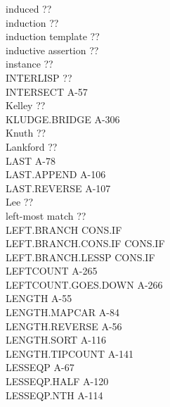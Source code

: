 \documentclass[10pt]{book}
\newenvironment{pubasis}{\begin{flushleft}}{\end{flushleft}}
\begin{document}
\begin{pubasis}
induced                                      ??\\
induction                                    ??\\
induction template                           ??\\
inductive assertion                          ??\\
instance                                     ??\\
INTERLISP                                    ??\\
INTERSECT                                    A-57\\
Kelley                                       ??\\
KLUDGE.BRIDGE                                A-306\\
Knuth                                        ??\\
Lankford                                     ??\\
LAST                                         A-78\\
LAST.APPEND                                  A-106\\
LAST.REVERSE                                 A-107\\
Lee                                          ??\\
left-most match                              ??\\
LEFT.BRANCH                                  CONS.IF\\
LEFT.BRANCH.CONS.IF                          CONS.IF\\
LEFT.BRANCH.LESSP                            CONS.IF\\
LEFTCOUNT                                    A-265\\
LEFTCOUNT.GOES.DOWN                          A-266\\
LENGTH                                       A-55\\
LENGTH.MAPCAR                                A-84\\
LENGTH.REVERSE                               A-56\\
LENGTH.SORT                                  A-116\\
LENGTH.TIPCOUNT                              A-141\\
LESSEQP                                      A-67\\
LESSEQP.HALF                                 A-120\\
LESSEQP.NTH                                  A-114\\

\end{pubasis}
\end{document}
